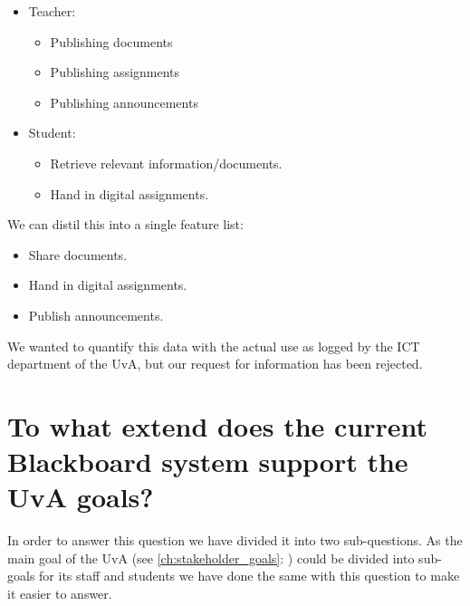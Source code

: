 \begin{itemize}
	\item Teacher:
	\begin{itemize}
		\item Publishing documents
		\item Publishing assignments
		\item Publishing announcements
	\end{itemize}
	
	\item Student:
	\begin{itemize}
		\item Retrieve relevant information/documents.
		\item Hand in digital assignments.
	\end{itemize}
\end{itemize}

We can distil this into a single feature list:
\begin{itemize}
	\item Share documents.
	\item Hand in digital assignments.
	\item Publish announcements.
\end{itemize}
We wanted to quantify this data with the actual use as logged by the ICT department of the UvA, but our request for information has been rejected.

\section{To what extend does the current Blackboard system support the UvA goals?} \label{uva_goal_question}
In order to answer this question we have divided it into two sub-questions. As the main goal of the UvA (see \ref{ch:stakeholder_goals}: ) could be divided into sub-goals for its staff and students we have done the same with this question to make it easier to answer.

